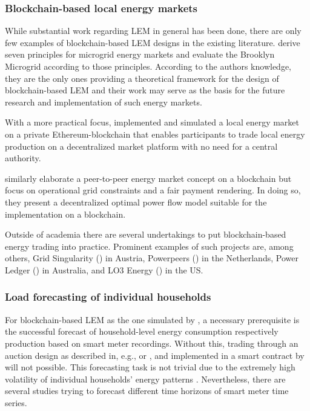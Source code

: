 \subsubsection{Blockchain-based local energy markets}

While substantial work regarding LEM in general has been done, there are only few examples of blockchain-based LEM designs in the existing literature. \citet{Mengelkamp:2018b} derive seven principles for microgrid energy markets and evaluate the Brooklyn Microgrid according to those principles. According to the authors knowledge, they are the only ones providing a theoretical framework for the design of blockchain-based LEM and their work may serve as the basis for the future research and implementation of such energy markets.

With a more practical focus, \citet{Mengelkamp:2018a} implemented and simulated a local energy market on a private Ethereum-blockchain that enables participants to trade local energy production on a decentralized market platform with no need for a central authority.

\citet{Münsing:2017} similarly elaborate a peer-to-peer energy market concept on a blockchain but focus on operational grid constraints and a fair payment rendering. In doing so, they present a decentralized optimal power flow model suitable for the implementation on a blockchain.

Outside of academia there are several undertakings to put blockchain-based energy trading into practice. Prominent examples of such projects are, among others, Grid Singularity () in Austria, Powerpeers () in the Netherlands, Power Ledger () in Australia, and LO3 Energy () in the US.



\subsubsection{Load forecasting of individual households}


For blockchain-based LEM as the one simulated by \citet{Mengelkamp:2018a}, a necessary prerequisite is the successful forecast of household-level energy consumption respectively production based on smart meter recordings. Without this, trading through an auction design as described in, e.g., \citet{Block:2008} or \citet{Buchmann:2013}, and implemented in a smart contract by \citet{Mengelkamp:2018a} will not possible. This forecasting task is not trivial due to the extremely high volatility of individual households' energy patterns \citep{Wang:2018}. Nevertheless, there are several studies trying to forecast different time horizons of smart meter time series.

